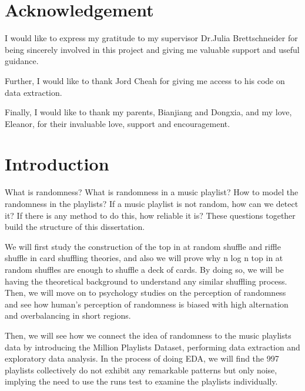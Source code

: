 \documentclass[12pt]{article}
\theoremstyle{plain}
\theoremstyle{definition}
\theoremstyle{remark}
\begin{document}
\hfill

\hfill

\hfill

\hfill

\section*{Acknowledgement}
I would like to express my gratitude to my supervisor Dr.Julia Brettschneider for being sincerely involved in this project and giving me valuable support and useful guidance. 

Further, I would like to thank Jord Cheah for giving me access to his code on data extraction.

Finally, I would like to thank my parents, Bianjiang and Dongxia, and my love, Eleanor, for their invaluable love, support and encouragement.

\clearpage

\tableofcontents

\clearpage


\section{Introduction}
What is randomness? What is randomness in a music playlist? How to model the randomness in the playlists? If a music playlist is not random, how can we detect it? If there is any method to do this, how reliable it is? These questions together build the structure of this dissertation. 

We will first study the construction of the top in at random shuffle and riffle shuffle in card shuffling theories, and also we will prove why n log n top in at random shuffles are enough to shuffle a deck of cards. By doing so, we will be having the theoretical background to understand any similar shuffling process. Then, we will move on to psychology studies on the perception of randomness and see how human’s perception of randomness is biased with high alternation and overbalancing in short regions. 

Then, we will see how we connect the idea of randomness to the music playlists data by introducing the Million Playlists Dataset, performing data extraction and exploratory data analysis. In the process of doing EDA, we will find the 997 playlists collectively do not exhibit any remarkable patterns but only noise, implying the need to use the runs test to examine the playlists individually. 
\end{document}
